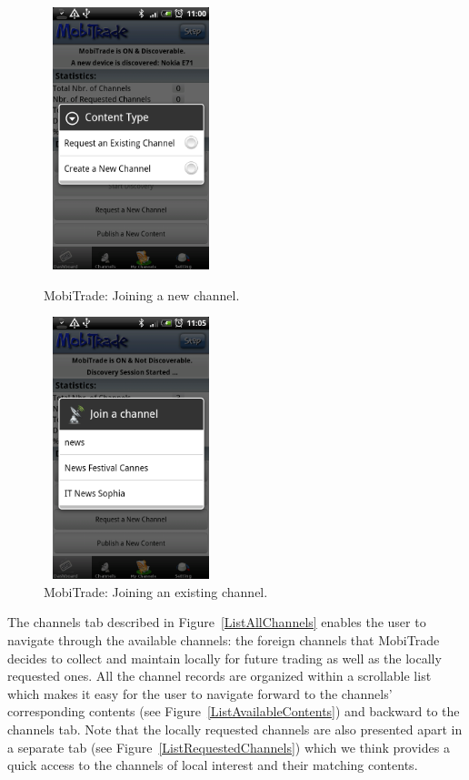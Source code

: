 \begin{figure}[!h]
\begin{minipage}[l]{0.3\linewidth}
\centering
\includegraphics[width=2in,height=3in]{Chapitre6/JoinChannel.png}
\begin{minipage}[l]{1\linewidth}
\small
\caption{MobiTrade: Joining a new channel.}
\normalsize
\label{JoiningNewChannel}
\end{minipage}
\end{minipage}
\hspace{2.1cm}
\begin{minipage}[l]{0.3\linewidth}
\centering
\includegraphics[width=2in,height=3in]{Chapitre6/JoinExistingChannel.png}
\begin{minipage}[l]{1\linewidth}
\caption{MobiTrade: Joining an existing channel.}
\label{JoiningExistingChannel}
\end{minipage}
\end{minipage}
\end{figure}

The channels tab described in Figure~\ref{ListAllChannels} enables the user to navigate through the available channels: the foreign channels that MobiTrade decides to collect and maintain locally for future trading as well as the locally requested ones. All the channel records are organized within a scrollable list which makes it easy for the user to navigate forward to the channels' corresponding contents (see Figure~\ref{ListAvailableContents}) and backward to the channels tab. Note that the locally requested channels are also presented apart in a separate tab (see Figure~\ref{ListRequestedChannels}) which we think provides a quick access to the channels of local interest and their matching contents.

